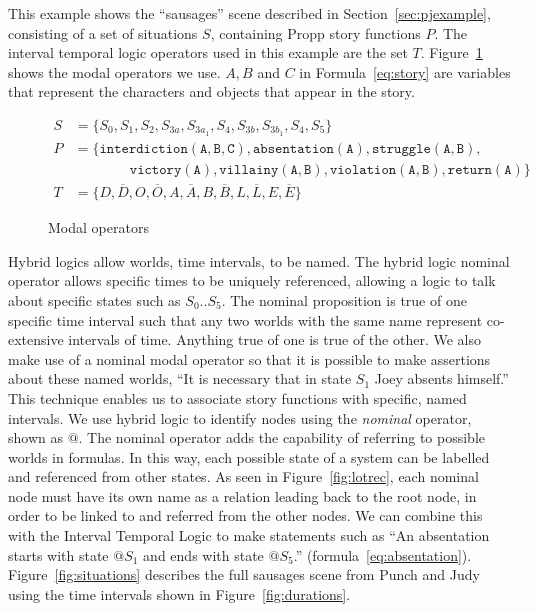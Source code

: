 \documentclass[11pt]{report}
\begin{document}
This example shows the ``sausages'' scene described in Section~\ref{sec:pjexample}, consisting of a set of situations $S$, containing Propp story functions $P$. The interval temporal logic operators used in this example are the set $T$. Figure~\ref{fig:operators} shows the modal operators we use. $A, B$ and $C$ in Formula~\ref{eq:story} are variables that represent the characters and objects that appear in the story.
\begin{figure}[!t]
\begin{align}
    S &= \{S_0, S_1, S_2, S_{3a}, S_{3a_1}, S_4, S_{3b}, S_{3b_1}, S_4, S_5\}\\
    P &= \{\mathtt{interdiction(A, B, C), absentation(A), struggle(A, B),}\nonumber\\
  &\qquad\qquad\mathtt{victory(A), villainy(A, B), violation(A, B), return(A)}\}\label{eq:story}\\
  T &= \{D, \overline{D}, O, \overline{O}, A, \overline{A}, B, \overline{B}, L, \overline{L}, E, \overline{E}\}
\end{align}
\caption{Modal operators}\label{fig:operators}
\end{figure}
Hybrid logics allow worlds, time intervals, to be named. The hybrid logic nominal operator allows specific times to be uniquely referenced, allowing a logic to talk about specific states such as $S_0..S_5$. The nominal proposition is true of one specific time interval such that any two worlds with the same name represent co-extensive intervals of time. Anything true of one is true of the other.
We also make use of a nominal modal operator so that it is possible to make assertions about these named worlds, ``It is necessary that in state $S_1$ Joey absents himself.'' This technique enables us to associate story functions with specific, named intervals.
We use hybrid logic to identify nodes using the \emph{nominal} operator, shown as $@$. The nominal operator adds the capability of referring to possible worlds in formulas. In this way, each possible state of a system can be labelled and referenced from other states. As seen in Figure~\ref{fig:lotrec}, each nominal node must have its own name as a relation leading back to the root node, in order to be linked to and referred from the other nodes.
We can combine this with the Interval Temporal Logic to make statements such as ``An absentation starts with state $@S_1$ and ends with state $@S_5$.'' (formula~\ref{eq:absentation}).
Figure~\ref{fig:situations} describes the full sausages scene from Punch and Judy using the time intervals shown in Figure~\ref{fig:durations}.
\end{document}
